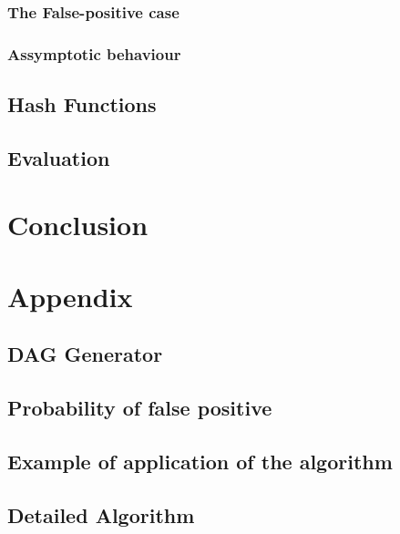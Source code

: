 \documentclass[a4paper,10pt]{report}
\theoremstyle{definition}
\theoremstyle{definition}
\begin{document}
\subsection{The False-positive case}
\label{sec:fp}

\subsection{Assymptotic behaviour}

\section{Hash Functions}

\section{Evaluation}

\chapter{Conclusion}

%   

\chapter{Appendix}
\section{DAG Generator}
\label{sec:daggen}

\section{Probability of false positive}
\label{sec:proof}

\section{Example of application of the algorithm}
\label{sec:exapp}
%
\section{Detailed Algorithm}%
\label{sec:detailedalgo}%

% 
%   
\end{document}
